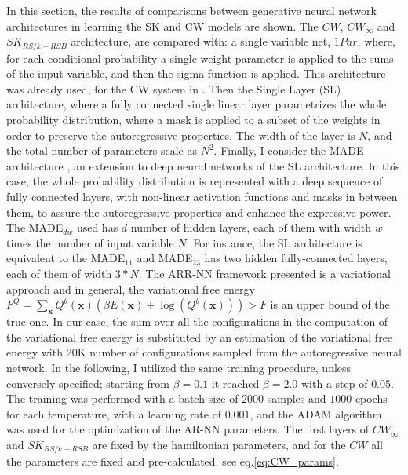 \documentclass[aps,physrev,10pt,floatfix,reprint]{revtex4-2}
\begin{document}
In this section, the results of comparisons between generative neural network architectures in learning the SK and CW models are shown. 
The $CW$, $CW_{\infty}$ and $SK_{RS/k-RSB}$ architecture, are compared with: a single variable net, $1Par$, where, for each conditional probability a single weight parameter is applied to the sums of the input variable, and then the sigma function is applied. This architecture was already used, for the CW system in \cite{https://doi.org/10.48550/arxiv.2210.11145}. Then the Single Layer (SL) architecture, where a fully connected single linear layer parametrizes the whole probability distribution, where a mask is applied to a subset of the weights in order to preserve the autoregressive properties. The width of the layer is $N$, and the total number of parameters scale as $N^2$. Finally, I consider the MADE architecture \cite{pmlr-v37-germain15}, an extension to deep neural networks of the SL architecture. In this case, the whole probability distribution is represented with a deep sequence of fully connected layers, with non-linear activation functions and masks in between them, to assure the autoregressive properties and enhance the expressive power. The MADE$_{dw}$ used has $d$ number of hidden layers, each of them with width $w$ times the number of input variable $N$. For instance, the SL architecture is equivalent to the MADE$_{11}$ and MADE$_{23}$ has two hidden fully-connected layers, each of them of width $3*N$. 
The ARR-NN framework presented is a variational approach and in general, the variational free energy $F^{Q} =  \sum_{\mathbf{x}} Q^{\theta}(\mathbf{x})(\beta E(\mathbf{x}) + \log(Q^{\theta}(\mathbf{x}))) > F$ is an upper bound of the true one. In our case, the sum over all the configurations in the computation of the variational free energy is substituted by an estimation of the variational free energy with 20K number of configurations sampled from the autoregressive neural network.
In the following, I utilized the same training procedure, unless conversely specified; starting from $\beta=0.1$ it reached $\beta=2.0$ with a step of $0.05$. The training was performed with a batch size of $2000$ samples and $1000$ epochs for each temperature, with a learning rate of $0.001$, and the ADAM algorithm was used for the optimization of the AR-NN parameters. 
The first layers of $CW_{\infty}$ and $SK_{RS/k-RSB}$ are fixed by the hamiltonian parameters, and for the $CW$ all the parameters are fixed and pre-calculated, see eq.\ref{eq:CW_params}.\\
\end{document}
